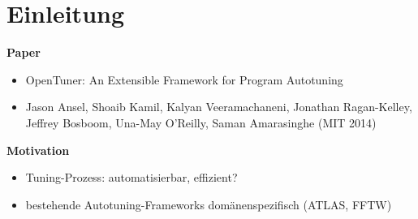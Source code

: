     \tuctwoheadlines

    

    \section{Einleitung}
    
  \begin{frame}
    \tableofcontents[currentsection]
  \end{frame}


  \begingroup
    \begin{frame}
    
    \textbf{Paper}
    \begin{itemize}
    
        \item OpenTuner: An Extensible Framework for Program Autotuning
        
        \item Jason Ansel, Shoaib Kamil, Kalyan Veeramachaneni, Jonathan Ragan-Kelley, Jeffrey Bosboom, Una-May O'Reilly, Saman Amarasinghe (MIT 2014)
        
    \end{itemize}
    
    \text{}
    
    \textbf{Motivation}
        
    \begin{itemize}
      
      \item Tuning-Prozess: automatisierbar, effizient?
      
      \item bestehende Autotuning-Frameworks domänenspezifisch (ATLAS, FFTW)
      

\end{itemize}
\end{frame}
